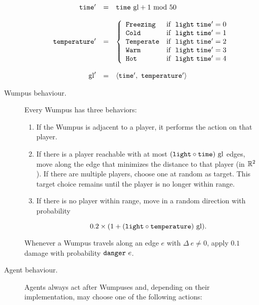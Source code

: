 \begin{definition}
\begin{description}
	$$
		\begin{array}{r c l}
		   \field{time'} & = &  \field{time}\ \mathrm{gl} + 1\ \mathrm{mod}\ 50\\
		   \\
			\field{temperature'} & = &
			\left\{
				\begin{array}{l l}
					\type{Freezing} & \mt{if }\ \field{light}\ \field{time'} = 0\\
					\type{Cold} & \mt{if }\ \field{light}\ \field{time'} = 1\\
					\type{Temperate} & \mt{if }\ \field{light}\ \field{time'} = 2\\
					\type{Warm} & \mt{if }\ \field{light}\ \field{time'} = 3\\
					\type{Hot} & \mt{if }\ \field{light}\ \field{time'} = 4
				\end{array}
			\right.\\
			\\
			\mathrm{gl}' & = & \langle \field{time'},\ \field{temperature'} \rangle\\
		\end{array}
	$$
	
	\item[Wumpus behaviour.] Every Wumpus has three behaviors:
	
	\begin{enumerate}
		\item If the Wumpus is adjacent to a player, it performs the  action on that player.
		
		\item If there is a player reachable with at most $(\field{light} \circ \field{time})\ \mathrm{gl}$ edges, move along the edge that minimizes the distance to that player (in $\mathbb{R}^2$). If there are multiple players, choose one at random as target. This target choice remains until the player is no longer within range.
		
		\item If there is no player within range, move in a random direction with probability
		
		$$
			0.2 \times (1 + (\mathtt{light} \circ \mathtt{temperature})\ \mathrm{gl}).
		$$
	\end{enumerate}
	
	Whenever a Wumpus travels along an edge $e$ with $\Delta\ e \neq 0$, apply $0.1$ damage with probability $\field{danger}\ e$.
	
	\item[Agent behaviour.] Agents always act after Wumpuses and, depending on their implementation, may choose one of the following actions:
	

\end{description}
\end{definition}
